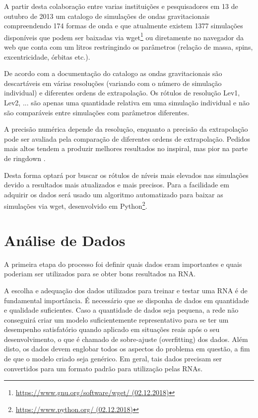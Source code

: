 A partir desta colaboração entre varias instituições e pesquisadores em 13 de outubro de 2013 um catalogo de simulações de ondas gravitacionais compreendendo 174 formas de onda e que atualmente existem 1377 simulações disponíveis que podem ser baixadas via wget\footnote{\href{https://www.gnu.org/software/wget/}{https://www.gnu.org/software/wget/ (02.12.2018)}} ou diretamente no navegador da web que conta com um litros restringindo os parâmetros (relação de massa, spins, excentricidade, órbitas etc.).

De acordo com a documentação do catalogo as ondas gravitacionais são descartáveis em várias resoluções (variando com o número de simulação individual) e diferentes ordens de extrapolação. Os rótulos de resolução Lev1, Lev2, ... são apenas uma quantidade relativa em uma simulação individual e não são comparáveis entre simulações com parâmetros diferentes. 

A precisão numérica depende da resolução, enquanto a precisão da extrapolação pode ser avaliada pela comparação de diferentes ordens de extrapolação. Pedidos mais altos tendem a produzir melhores resultados no inspiral, mas pior na parte de ringdown \cite{philipp}. 

Desta forma optará por buscar os rótulos de níveis mais elevados nas simulações devido a resultados mais atualizados e mais precisos. Para a facilidade em adquirir os dados será usado um algoritmo automatizado para baixar as simulações via wget, desenvolvido em Python\footnote{\href{https://www.python.org/}{https://www.python.org/ (02.12.2018)}}.

\section{Análise de Dados}
A primeira etapa do processo foi definir quais dados eram importantes e quais poderiam ser utilizados para se obter bons resultados na RNA.

A escolha e adequação dos dados utilizados para treinar e testar uma RNA é de fundamental importância. É necessário que se disponha de dados em quantidade e qualidade suficientes. Caso a quantidade de dados seja pequena, a rede não conseguirá criar um modelo suficientemente representativo para se ter um desempenho satisfatório quando aplicado em situações reais após o seu desenvolvimento, o que é chamado de sobre-ajuste (overfitting) dos dados. Além disto, os dados devem englobar todos os aspectos do problema em questão, a fim de que o modelo
criado seja genérico. Em geral, tais dados precisam ser convertidos para um formato padrão para utilização pelas RNAs. 

